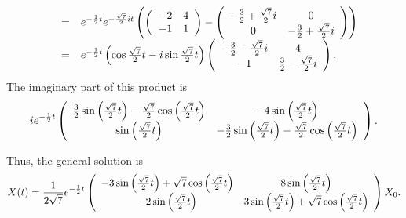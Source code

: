 \documentclass{ximera}
\begin{document}
\begin{exercise}
\begin{solution}
\[\begin{array}{rcl}
& = & e^{-\frac{1}{2}t}e^{-\frac{\sqrt{7}}{2}it}
\left(\left(\begin{array}{rr} -2 & 4\\ -1 &1\end{array}\right) - \left(\begin{array}{cc} -\frac{3}{2} + \frac{\sqrt{7}}{2}i & 0\\ 0 &-\frac{3}{2} + \frac{\sqrt{7}}{2}i\end{array}\right)\right) \\
& = & e^{-\frac{1}{2}t}\left(\cos\frac{\sqrt{7}}{2}t -
i\sin\frac{\sqrt{7}}{2}t\right)
\left(\begin{array}{cc} -\frac{3}{2} - \frac{\sqrt{7}}{2}i & 4\\ -1 &\frac{3}{2} -
\frac{\sqrt{7}}{2}i\end{array}\right).
\end{array}
\]
The imaginary part of this product is
\[
ie^{-\frac{1}{2}t}\left(\begin{array}{cc} \frac{3}{2}\sin\left(\frac{\sqrt{7}}{2}
t\right) - \frac{\sqrt{7}}{2}\cos\left(\frac{\sqrt{7}}{2}t\right) & -4\sin\left(\frac{\sqrt{7}}{2}t\right)\\ \sin\left(\frac{\sqrt{7}}{2}t\right) &-\frac{3}{2}\sin\left(\frac{\sqrt{7}}{2}
t\right) - \frac{\sqrt{7}}{2}\cos\left(\frac{\sqrt{7}}{2}t\right)\end{array}\right).
\]

Thus, the general solution is
\[
X(t) = \frac{1}{2\sqrt{7}}
e^{-\frac{1}{2}t}\left(\begin{array}{cc} -3\sin\left(\frac{\sqrt{7}}{2}t\right) +
\sqrt{7}\cos\left(\frac{\sqrt{7}}{2}t\right) & 8\sin\left(\frac{\sqrt{7}}{2}t\right)\\ -2\sin\left(\frac{\sqrt{7}}{2}t\right) &3\sin\left(\frac{\sqrt{7}}{2}t\right) +
\sqrt{7}\cos\left(\frac{\sqrt{7}}{2}t\right)\end{array}\right)X_0.
\]


\end{solution}
\end{exercise}
\end{document}
